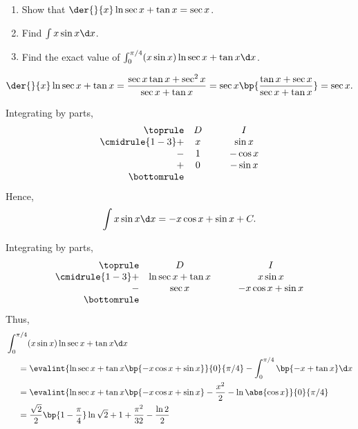 \begin{problem}
    \begin{enumerate}
        \item Show that $\der{}{x} \ln{\sec x + \tan x} = \sec x$.
        \item Find $\int x \sin x \d x$.
        \item Find the exact value of $\int_0^{\pi/4} (x\sin x)\ln{\sec x + \tan x} \d x$.
    \end{enumerate}
\end{problem}
\clearpage
\begin{solution}
    \begin{ppart}
        \[\der{}{x} \ln{\sec x + \tan x} = \frac{\sec x \tan x + \sec^2 x}{\sec x + \tan x} = \sec x \bp{\frac{\tan x + \sec x}{\sec x + \tan x}} = \sec x.\]
    \end{ppart}
    \begin{ppart}
        Integrating by parts,
        \[
            \begin{array}{r c @{\hspace*{1.0cm}} c}\toprule
                & D & I \\\cmidrule{1-3}
                + & x & \sin x \\
                - & 1 & -\cos x  \\
                + & 0 & -\sin x \\\bottomrule
            \end{array}
        \]
        Hence, \[\int x \sin x \d x = -x\cos x + \sin x + C.\]
    \end{ppart}
    \begin{ppart}
        Integrating by parts,
        \[
            \begin{array}{r c @{\hspace*{1.0cm}} c}\toprule
                & D & I \\\cmidrule{1-3}
                + & \ln{\sec x + \tan x} & x\sin x \\
                - & \sec x & -x\cos x + \sin x  \\\bottomrule
            \end{array}
        \]
        Thus,
        \begin{align*}
            & \int_0^{\pi/4} (x\sin x)\ln{\sec x + \tan x} \d x\\
            &\mspace{25 mu}= \evalint{\ln{\sec x + \tan x}\bp{-x\cos x + \sin x}}{0}{\pi/4} - \int_0^{\pi/4} \bp{-x + \tan x} \d x\\
            &\mspace{25 mu}= \evalint{\ln{\sec x + \tan x}\bp{-x\cos x + \sin x}-\frac{x^2}2 - \ln \abs{\cos x}}{0}{\pi/4}\\
            &\mspace{25 mu}= \frac{\sqrt2}2\bp{1 - \frac\pi4}\ln{\sqrt2 + 1} + \frac{\pi^2}{32} - \frac{\ln 2}2
        \end{align*}
    \end{ppart}
\end{solution}

